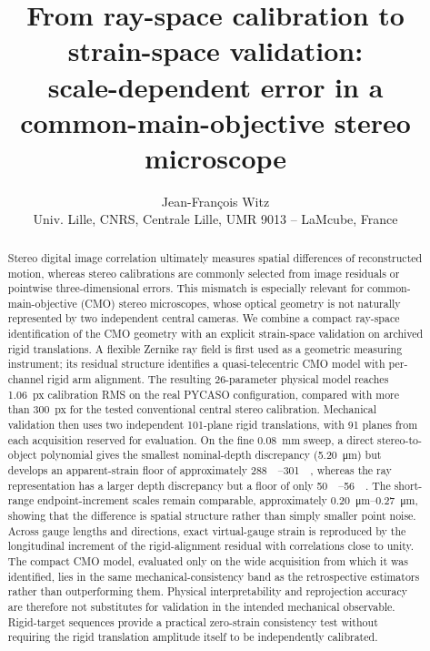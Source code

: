 \documentclass[11pt]{article}
\title{From ray-space calibration to strain-space validation:\\
scale-dependent error in a common-main-objective stereo microscope}
\author{Jean-Fran\c{c}ois Witz\\
\small Univ. Lille, CNRS, Centrale Lille, UMR 9013 -- LaMcube, France}
\date{}
\begin{document}
\maketitle

\begin{abstract}
Stereo digital image correlation ultimately measures spatial differences of reconstructed motion, whereas stereo calibrations are commonly selected from image residuals or pointwise three-dimensional errors. This mismatch is especially relevant for common-main-objective (CMO) stereo microscopes, whose optical geometry is not naturally represented by two independent central cameras. We combine a compact ray-space identification of the CMO geometry with an explicit strain-space validation on archived rigid translations. A flexible Zernike ray field is first used as a geometric measuring instrument; its residual structure identifies a quasi-telecentric CMO model with per-channel rigid arm alignment. The resulting 26-parameter physical model reaches \SI{1.06}{px} calibration RMS on the real PYCASO configuration, compared with more than \SI{300}{px} for the tested conventional central stereo calibration. Mechanical validation then uses two independent 101-plane rigid translations, with 91 planes from each acquisition reserved for evaluation. On the fine \SI{0.08}{mm} sweep, a direct stereo-to-object polynomial gives the smallest nominal-depth discrepancy (\SI{5.20}{\micro\metre}) but develops an apparent-strain floor of approximately \SIrange{288}{301}{\micro\strain}, whereas the ray representation has a larger depth discrepancy but a floor of only \SIrange{50}{56}{\micro\strain}. The short-range endpoint-increment scales remain comparable, approximately \SIrange{0.20}{0.27}{\micro\metre}, showing that the difference is spatial structure rather than simply smaller point noise. Across gauge lengths and directions, exact virtual-gauge strain is reproduced by the longitudinal increment of the rigid-alignment residual with correlations close to unity. The compact CMO model, evaluated only on the wide acquisition from which it was identified, lies in the same mechanical-consistency band as the retrospective estimators rather than outperforming them. Physical interpretability and reprojection accuracy are therefore not substitutes for validation in the intended mechanical observable. Rigid-target sequences provide a practical zero-strain consistency test without requiring the rigid translation amplitude itself to be independently calibrated.
\end{abstract}
\end{document}
